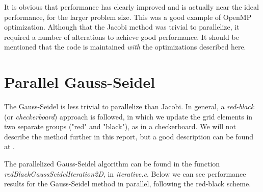 \documentclass[11pt]{report}
\begin{document}
It is obvious that performance has clearly improved and is actually near the ideal performance, for the larger problem size. This was a good example of OpenMP optimization. Although that the Jacobi method was trivial to parallelize, it required a number of alterations to achieve good performance. It should be mentioned that the code is maintained \emph{with} the optimizations described here.

\section{Parallel Gauss-Seidel}
The Gauss-Seidel is less trivial to parallelize than Jacobi. In general, a \emph{red-black} (or \emph{checkerboard}) approach is followed, in which we update the grid elements in two separate groups ("red" and "black"), as in a checkerboard. We will not describe the method further in this report, but a good description can be found at \cite{karniadakis}.
\newline

The parallelized Gauss-Seidel algorithm can be found in the function \emph{redBlackGaussSeidelIteration2D}, in \emph{iterative.c}. Below we can see performance results for the Gauss-Seidel method in parallel, following the red-black scheme.
\end{document}
